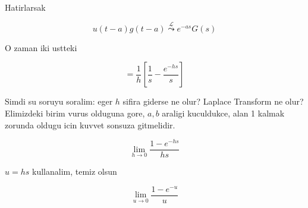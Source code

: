 \documentclass[12pt,fleqn]{article}
\begin{document}
Hatirlarsak

\[ u(t-a)g(t-a) \stackrel{\mathcal{L}}{\leadsto}  e^{-as}G(s) \]

O zaman iki ustteki

\[ = \frac{1}{h}[ \frac{1}{s} - \frac{e^{-hs}}{s} ]\]

Simdi su soruyu soralim: eger $h$ sifira giderse ne olur? Laplace Transform
ne olur? Elimizdeki birim vurus olduguna gore, $a,b$ araligi kuculdukce,
alan 1 kalmak zorunda oldugu icin kuvvet sonsuza gitmelidir. 

\[ \lim_{h \to 0} \frac{1-e^{-hs}}{hs} \]

$u=hs$ kullanalim, temiz olsun 

\[ \lim_{u \to 0} \frac{1-e^{-u}}{u} \]
\end{document}
